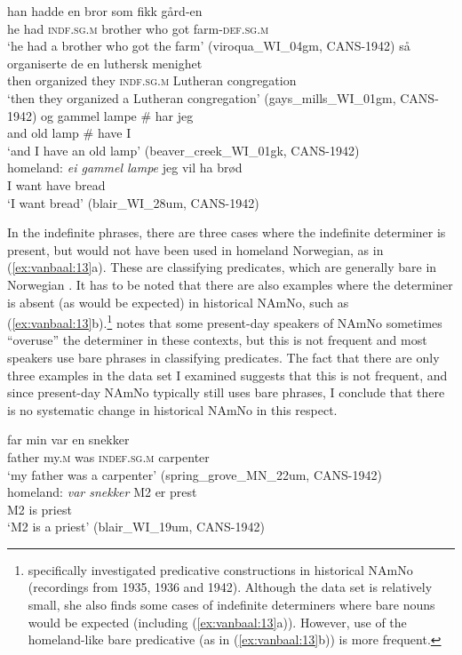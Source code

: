 \documentclass[output=paper]{langscibook}
\begin{document}
\ea \label{ex:vanbaal:12}
\ea \label{ex:vanbaal:12a}
\gll han hadde en bror som fikk gård-en \\
    he had \textsc{indf.sg.m} brother who got farm-\textsc{def.sg.m} \\
\glt `he had a brother who got the farm' (viroqua\_WI\_04gm, CANS-1942)
\ex \label{ex:vanbaal:12b}
\gll så organiserte de en luthersk menighet \\
    then organized they \textsc{indf.sg.m} Lutheran congregation \\
\glt `then they organized a Lutheran congregation' (gays\_mills\_WI\_01gm, CANS-1942)
\ex \label{ex:vanbaal:12c}
\gll og gammel lampe \# har jeg \\
    and old lamp \# have I \\
\glt `and I have an old lamp' (beaver\_creek\_WI\_01gk, CANS-1942)\\
homeland: \textit{ei gammel lampe}
\ex\label{ex:vanbaal:12d}
\gll jeg vil ha brød \\
    I want have bread \\
\glt `I want bread' (blair\_WI\_28um, CANS-1942)
\z
\z 

In the indefinite phrases, there are three cases where the indefinite determiner is present, but would not have been used in homeland Norwegian, as in (\ref{ex:vanbaal:13}a). These are classifying predicates, which are generally bare in Norwegian \citep[see][]{Kinn2020}. It has to be noted that  there are also examples where the determiner is absent (as would be expected) in historical NAmNo, such as (\ref{ex:vanbaal:13}b).\footnote{\citet{MorlandBA} specifically investigated predicative constructions in historical NAmNo (recordings from 1935, 1936 and 1942). Although the data set is relatively small, she also finds some cases of indefinite determiners where bare nouns would be expected (including (\ref{ex:vanbaal:13}a)). However, use of the homeland-like bare predicative (as in (\ref{ex:vanbaal:13}b)) is more frequent.} \citet{Kinn2020} notes that some present-day speakers of NAmNo sometimes ``overuse'' the determiner in these contexts, but this is not frequent and most speakers use bare phrases in classifying predicates. The fact that there are only three examples in the data set I examined suggests that this is not frequent, and since present-day NAmNo typically still uses bare phrases, I conclude that there is no systematic change in historical NAmNo in this respect.
 

\ea\label{ex:vanbaal:13}
\ea\label{ex:vanbaal:13a}
\gll far min var en snekker \\
    father my.\textsc{m} was \textsc{indef.sg.m} carpenter \\
\glt `my father was a carpenter' (spring\_grove\_MN\_22um, CANS-1942) \\
homeland: \textit{var snekker}
\ex \label{ex:vanbaal:13b}
\gll M2 er prest \\
    M2 is priest \\
\glt `M2 is a priest' (blair\_WI\_19um, CANS-1942)
\z
\z
\end{document}
